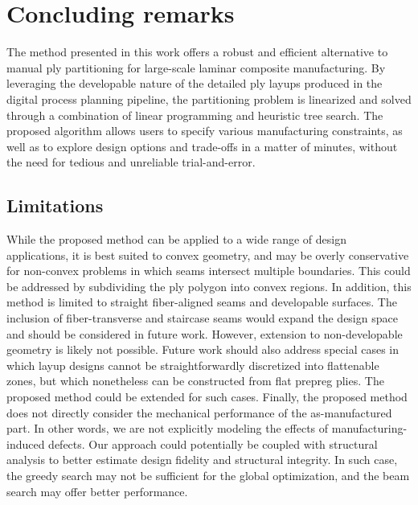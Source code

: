 \section{Concluding remarks}
\label{sec_conclusions}

The method presented in this work offers a robust and efficient alternative to manual ply partitioning for large-scale laminar composite manufacturing. By leveraging the developable nature of the detailed ply layups produced in the digital process planning pipeline, the partitioning problem is linearized and solved through a combination of linear programming and heuristic tree search. The proposed algorithm allows users to specify various manufacturing constraints, as well as to explore design options and trade-offs in a matter of minutes, without the need for tedious and unreliable trial-and-error. 

\subsection{Limitations}
While the proposed method can be applied to a wide range of design applications, it is best suited to convex geometry, and may be overly conservative for non-convex problems in which seams intersect multiple boundaries. This could be addressed by subdividing the ply polygon into convex regions. In addition, this method is limited to straight fiber-aligned seams and developable surfaces. The inclusion of fiber-transverse and staircase seams would expand the design space and should be considered in future work. However, extension to non-developable geometry is likely not possible.
%
Future work should also address special cases in which layup designs cannot be straightforwardly discretized into flattenable zones, but which nonetheless can be constructed from flat prepreg plies. The proposed method could be extended for such cases. 
%
Finally, the proposed method does not directly consider the mechanical performance of the as-manufactured part. In other words, we are not explicitly modeling the effects of manufacturing-induced defects. Our approach could potentially be coupled with structural analysis to better estimate design fidelity and structural integrity. In such case, the greedy search may not be sufficient for the global optimization, and the beam search may offer better performance.